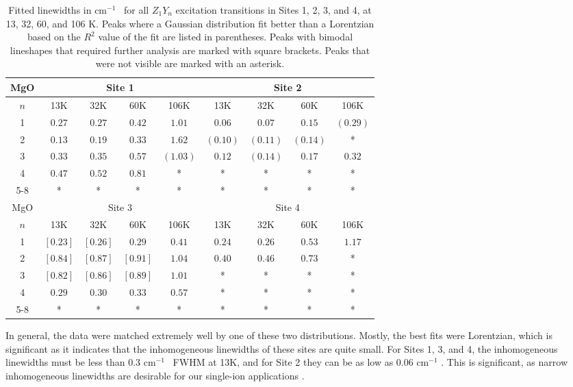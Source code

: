 \documentclass[12pt]{puthesis}
\newcommand{\wn}[1][ ]{cm$^{-1}$#1}
\begin{document}
\begin{table}[t]
  \centering
  \begin{tabular}{|c| c| c | c | c | c | c | c | c|}
    \hline
    MgO & \multicolumn{4}{c|}{Site 1} & \multicolumn{4}{c|}{Site 2} \\
    \hline
    $n$ & 13K & 32K & 60K & 106K & 13K & 32K & 60K & 106K \\
    \hline
    1 & $0.27$ & $0.27$ & $0.42$ & $1.01$   & $0.06$   & $0.07$   & $0.15$   & $(0.29)$ \\
    2 & $0.13$ & $0.19$ & $0.33$ & $1.62$   & $(0.10)$ & $(0.11)$ & $(0.14)$ & *      \\
    3 & $0.33$ & $0.35$ & $0.57$ & $(1.03)$ & $0.12$   & $(0.14)$ & $0.17$   & $0.32$ \\
    4 & $0.47$ & $0.52$ & $0.81$ & *        & *        & *        & *        & *      \\
    5-8 & * & * & * & * & * & * & * & * \\
    \hline \hline
    MgO & \multicolumn{4}{c|}{Site 3} & \multicolumn{4}{c|}{Site 4} \\
    \hline
    $n$ & 13K & 32K & 60K & 106K & 13K & 32K & 60K & 106K \\
    \hline
    1 & $[0.23]$ & $[0.26]$ & $0.29$ & $0.41$ & $0.24$ & $0.26$ & $0.53$ & $1.17$ \\
    2 & $[0.84]$ & $[0.87]$ & $[0.91]$ & $1.04$ & $0.40$ & $0.46$ & $0.73$ & *      \\
    3 & $[0.82]$ & $[0.86]$ & $[0.89]$ & $1.01$ & *      & *      & *      & *      \\
    4 & $0.29$ & $0.30$ & $0.33$ & $0.57$ & *      & *      & *      & *      \\
    5-8 & * & * & * & * & * & * & * & * \\
    \hline
  \end{tabular}
  \caption{Fitted linewidths in \wn\ for all $Z_{1}Y_{n}$ excitation transitions in Sites 1, 2, 3, and 4, at 13, 32, 60, and 106 K. Peaks where a Gaussian distribution fit better than a Lorentzian based on the $R^{2}$ value of the fit are listed in parentheses. Peaks with bimodal lineshapes that required further analysis are marked with square brackets. Peaks that were not visible are marked with an asterisk.}
  \label{tab:mgolinewidths}
\end{table}

In general, the data were matched extremely well by one of these two distributions. Mostly, the best fits were Lorentzian, which is significant as it indicates that the inhomogeneous linewidths of these sites are quite small. For Sites 1, 3, and 4, the inhomogeneous linewidths must be less than 0.3 \wn\ FWHM at 13K, and for Site 2 they can be as low as 0.06 \wn. This is significant, as narrow inhomogeneous linewidths are desirable for our single-ion applications \cite{Dibos2017}.
\end{document}
